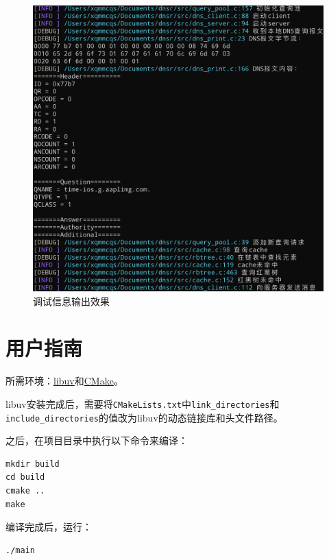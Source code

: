\documentclass[lang=cn,11pt,a4paper,cite=authornum]{paper}
\begin{document}
\begin{figure}[htbp]

    \centering
    \includegraphics[width=\linewidth]{./Images/log.png}
    \caption{调试信息输出效果\label{fig:log}}

\end{figure}

\section{用户指南}

所需环境：\href{https://github.com/libuv/libuv}{libuv}和\href{https://cmake.org/download/}{CMake}。

libuv安装完成后，需要将\texttt{CMakeLists.txt}中\texttt{link_directories}和\texttt{include_directories}的值改为libuv的动态链接库和头文件路径。

之后，在项目目录中执行以下命令来编译：

\begin{code}
\begin{verbatim}
mkdir build
cd build
cmake ..
make
\end{verbatim}
\end{code}

编译完成后，运行：

\begin{code}
\begin{verbatim}
./main
\end{verbatim}
\end{code}
\end{document}
